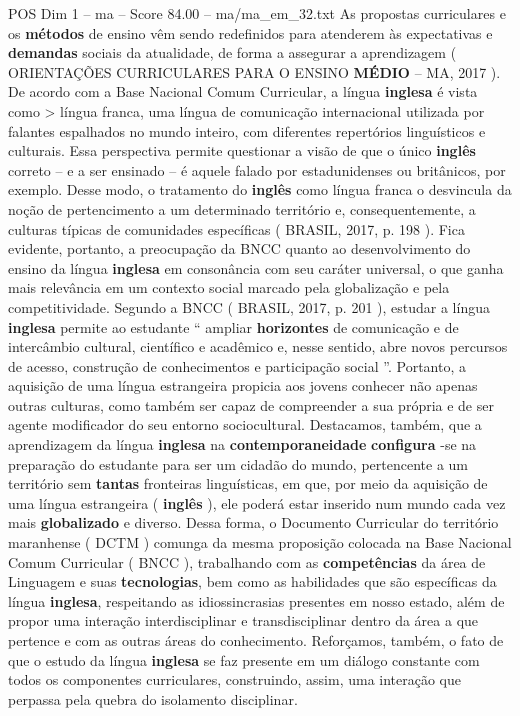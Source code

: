\begin{textsample}{POS Dim 1 – ma – Score 84.00 – ma/ma\_em\_32.txt}
As propostas curriculares e os \textbf{métodos} de ensino vêm sendo redefinidos para atenderem às expectativas e \textbf{demandas} sociais da atualidade, de forma a assegurar a aprendizagem ( ORIENTAÇÕES CURRICULARES PARA O ENSINO \textbf{MÉDIO} – MA, 2017 ).
De acordo com a Base Nacional Comum Curricular, a língua \textbf{inglesa} é vista como > língua franca, uma língua de comunicação internacional utilizada por falantes espalhados no mundo inteiro, com diferentes repertórios linguísticos e culturais.
Essa perspectiva permite questionar a visão de que o único \textbf{inglês} correto – e a ser ensinado – é aquele falado por estadunidenses ou britânicos, por exemplo.
Desse modo, o tratamento do \textbf{inglês} como língua franca o desvincula da noção de pertencimento a um determinado território e, consequentemente, a culturas típicas de comunidades específicas ( BRASIL, 2017, p. 198 ).
Fica evidente, portanto, a preocupação da BNCC quanto ao desenvolvimento do ensino da língua \textbf{inglesa} em consonância com seu caráter universal, o que ganha mais relevância em um contexto social marcado pela globalização e pela competitividade.
Segundo a BNCC ( BRASIL, 2017, p. 201 ), estudar a língua \textbf{inglesa} permite ao estudante “ ampliar \textbf{horizontes} de comunicação e de intercâmbio cultural, científico e acadêmico e, nesse sentido, abre novos percursos de acesso, construção de conhecimentos e participação social ”.
Portanto, a aquisição de uma língua estrangeira propicia aos jovens conhecer não apenas outras culturas, como também ser capaz de compreender a sua própria e de ser agente modificador do seu entorno sociocultural.
Destacamos, também, que a aprendizagem da língua \textbf{inglesa} na \textbf{contemporaneidade} \textbf{configura} -se na preparação do estudante para ser um cidadão do mundo, pertencente a um território sem \textbf{tantas} fronteiras linguísticas, em que, por meio da aquisição de uma língua estrangeira ( \textbf{inglês} ), ele poderá estar inserido num mundo cada vez mais \textbf{globalizado} e diverso.
Dessa forma, o Documento Curricular do território maranhense ( DCTM ) comunga da mesma proposição colocada na Base Nacional Comum Curricular ( BNCC ), trabalhando com as \textbf{competências} da área de Linguagem e suas \textbf{tecnologias}, bem como as habilidades que são específicas da língua \textbf{inglesa}, respeitando as idiossincrasias presentes em nosso estado, além de propor uma interação interdisciplinar e transdisciplinar dentro da área a que pertence e com as outras áreas do conhecimento.
Reforçamos, também, o fato de que o estudo da língua \textbf{inglesa} se faz presente em um diálogo constante com todos os componentes curriculares, construindo, assim, uma interação que perpassa pela quebra do isolamento disciplinar.

\end{textsample}
